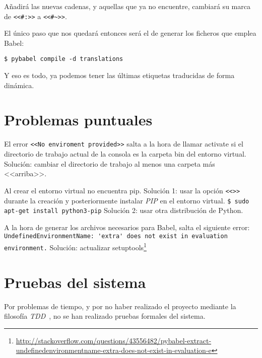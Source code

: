 Añadirá las nuevas cadenas, y aquellas que ya no encuentre, cambiará su marca de \texttt{<<\#:>>} a \texttt{<<\#\textasciitilde>>}.

El único paso que nos quedará entonces será el de generar los ficheros que emplea Babel:

\noindent\verb|$ pybabel compile -d translations|

Y eso es todo, ya podemos tener las últimas etiquetas traducidas de forma dinámica.



\section{Problemas puntuales}\label{manual-programador-problemas-puntuales}
El error \texttt{<<No enviroment provided>>} salta a la hora de llamar activate si el directorio de trabajo actual de la consola es la carpeta bin del entorno virtual.
\newline
Solución: cambiar el directorio de trabajo al menos una carpeta más <<arriba>>.

Al crear el entorno virtual no encuentra pip.
\newline
Solución 1: usar la opción \texttt{<<>>} durante la creación y posteriormente instalar \textit{PIP} en el entorno virtual.
\newline
\noindent\verb|$ sudo apt-get install python3-pip|
\newline
Solución 2: usar otra distribución de Python.

A la hora de generar los archivos necesarios para Babel, salta el siguiente error:
\newline
{\scriptsize\noindent\verb|UndefinedEnvironmentName: 'extra' does not exist in evaluation environment.|}
\newline
Solución: actualizar setuptools\footnote{\url{http://stackoverflow.com/questions/43556482/pybabel-extract-undefinedenvironmentname-extra-does-not-exist-in-evaluation-e}}



\section{Pruebas del sistema}
Por problemas de tiempo, y por no haber realizado el proyecto mediante la filosofía \textit{TDD}~\cite{wiki:TDD}, no se han realizado pruebas formales del sistema.
